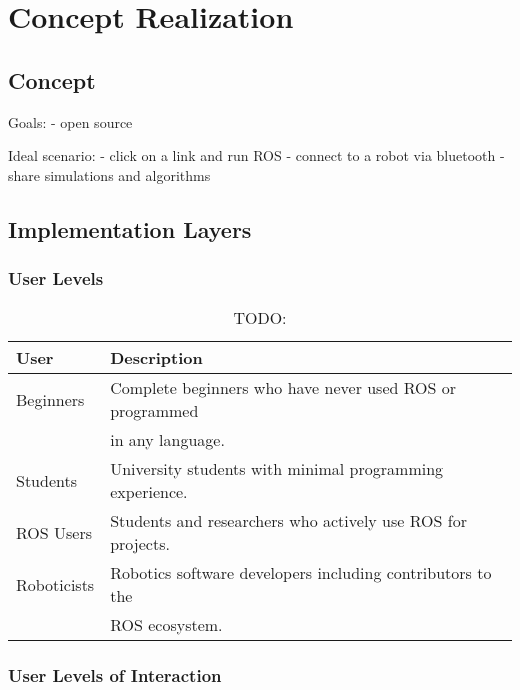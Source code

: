 \chapter{Concept Realization}\label{cha:concept}


\section{Concept}\label{sec:concept}

Goals:
- open source

Ideal scenario: 
- click on a link and run ROS
- connect to a robot via bluetooth
- share simulations and algorithms

\section{Implementation Layers}

    \subsection{User Levels}

        \begin{table}[htbp]
            \centering	
            \caption{TODO:}
                \begin{tabular}{ll}
                    \toprule
                    \textbf{User} & \textbf{Description} \\
                    \midrule
                    Beginners   & Complete beginners who have never used ROS or programmed \\
                                & in any language. \\[0.5em]
                    Students    & University students with minimal programming experience. \\[0.5em]
                    ROS Users   & Students and researchers who actively use ROS for projects. \\[0.5em]
                    Roboticists & Robotics software developers including contributors to the \\
                                & ROS ecosystem. \\
                \bottomrule
            \end{tabular}\label{tab:userlevels}
        \end{table}

    \subsection{User Levels of Interaction}

